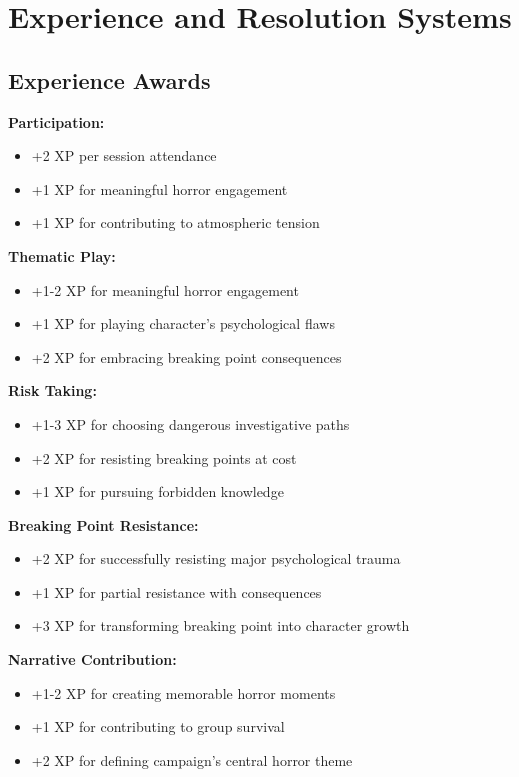 \documentclass[11pt]{article}
\begin{document}
\section{Experience and Resolution Systems}

\subsection{Experience Awards}

\textbf{Participation:}
\begin{itemize}
\item +2 XP per session attendance
\item +1 XP for meaningful horror engagement
\item +1 XP for contributing to atmospheric tension
\end{itemize}

\textbf{Thematic Play:}
\begin{itemize}
\item +1-2 XP for meaningful horror engagement
\item +1 XP for playing character's psychological flaws
\item +2 XP for embracing breaking point consequences
\end{itemize}

\textbf{Risk Taking:}
\begin{itemize}
\item +1-3 XP for choosing dangerous investigative paths
\item +2 XP for resisting breaking points at cost
\item +1 XP for pursuing forbidden knowledge
\end{itemize}

\textbf{Breaking Point Resistance:}
\begin{itemize}
\item +2 XP for successfully resisting major psychological trauma
\item +1 XP for partial resistance with consequences
\item +3 XP for transforming breaking point into character growth
\end{itemize}

\textbf{Narrative Contribution:}
\begin{itemize}
\item +1-2 XP for creating memorable horror moments
\item +1 XP for contributing to group survival
\item +2 XP for defining campaign's central horror theme
\end{itemize}
\end{document}
